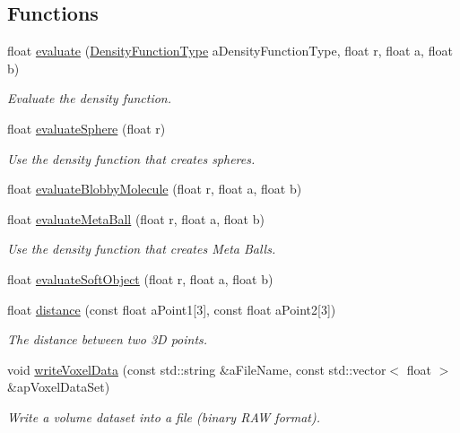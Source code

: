 \subsection*{Functions}
\begin{DoxyCompactItemize}
\item 
float \hyperlink{_implicit_surface_8inl_a2aee5d4a34861cbde35c6c2f77791c05}{evaluate} (\hyperlink{_implicit_surface_8h_ab3f34159fea0c465761074e4ffbdc325}{Density\-Function\-Type} a\-Density\-Function\-Type, float r, float a, float b)
\begin{DoxyCompactList}\small\item\em Evaluate the density function. \end{DoxyCompactList}\item 
float \hyperlink{_implicit_surface_8inl_a05dd90fdf368c0445a360977ef116320}{evaluate\-Sphere} (float r)
\begin{DoxyCompactList}\small\item\em Use the density function that creates spheres. \end{DoxyCompactList}\item 
float \hyperlink{_implicit_surface_8inl_a512710de855641bf04bdc15c4f80f080}{evaluate\-Blobby\-Molecule} (float r, float a, float b)
\item 
float \hyperlink{_implicit_surface_8inl_a1298af286a4d38c81ced0cdf4be4681c}{evaluate\-Meta\-Ball} (float r, float a, float b)
\begin{DoxyCompactList}\small\item\em Use the density function that creates Meta Balls. \end{DoxyCompactList}\item 
float \hyperlink{_implicit_surface_8inl_a54c6c14872491219d96b62e621927f32}{evaluate\-Soft\-Object} (float r, float a, float b)
\item 
float \hyperlink{_implicit_surface_8inl_a1219bc80300849441250bb050951a0f5}{distance} (const float a\-Point1\mbox{[}3\mbox{]}, const float a\-Point2\mbox{[}3\mbox{]})
\begin{DoxyCompactList}\small\item\em The distance between two 3\-D points. \end{DoxyCompactList}\item 
void \hyperlink{_implicit_surface_8inl_a3f89f0457c87632cda4ab367bc64a75a}{write\-Voxel\-Data} (const std\-::string \&a\-File\-Name, const std\-::vector$<$ float $>$ \&ap\-Voxel\-Data\-Set)
\begin{DoxyCompactList}\small\item\em Write a volume dataset into a file (binary R\-A\-W format). \end{DoxyCompactList}\end{DoxyCompactItemize}


